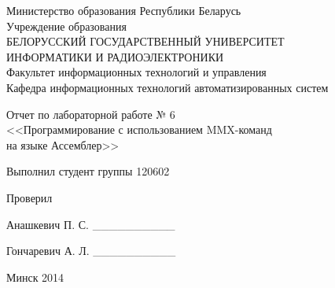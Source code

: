 \thispagestyle{empty}
\setlength{\parindent}{0ex} %

\begin{center}
  Министерство образования Республики Беларусь \\
  \vspace{0.5ex}
  Учреждение образования \\
  БЕЛОРУССКИЙ ГОСУДАРСТВЕННЫЙ УНИВЕРСИТЕТ \\
  ИНФОРМАТИКИ И РАДИОЭЛЕКТРОНИКИ \\
  \vspace{0.5ex}
  Факультет информационных технологий и управления \\
  \vspace{0.5ex}
  Кафедра информационных технологий автоматизированных систем
\end{center}

\vspace{50mm}

\begin{center}
  Отчет по лабораторной работе № 6 \\
  <<Программирование с использованием MMX-команд \\ на языке Ассемблер>>
\end{center}

\vspace{40mm}

\begin{minipage}{.55\linewidth}
    Выполнил студент группы 120602

    \smallskip

    Проверил
\end{minipage}
\hfill
\begin{minipage}{.4\linewidth}
  \begin{flushright}
    Анашкевич П. С. \_\_\_\_\_\_\_\_\_\_

    \smallskip

    Гончаревич А. Л. \_\_\_\_\_\_\_\_\_\_
  \end{flushright}
\end{minipage}

\vspace{65mm}
\begin{center}
  Минск 2014
\end{center}

\setlength{\parindent}{1.25cm} %

\newpage
